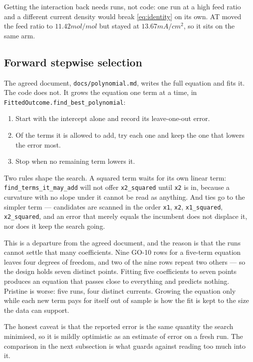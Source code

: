 Getting the interaction back needs runs, not code: one run at a high feed ratio and a different
current density would break \eqref{eq:identity} on its own. AT moved the feed ratio to
$11.42\unit{mol/mol}$ but stayed at $13.67\unit{mA/cm^2}$, so it sits on the same arm.

\subsection{Forward stepwise selection}

The agreed document, \texttt{docs/polynomial.md}, writes the full equation and fits it. The code
does not. It grows the equation one term at a time, in
\texttt{FittedOutcome.find\_best\_polynomial}:

\begin{enumerate}[nosep]
  \item Start with the intercept alone and record its leave-one-out error.
  \item Of the terms it is allowed to add, try each one and keep the one that lowers the error
        most.
  \item Stop when no remaining term lowers it.
\end{enumerate}

Two rules shape the search. A squared term waits for its own linear term:
\texttt{find\_terms\_it\_may\_add} will not offer \texttt{x2\_squared} until \texttt{x2} is in,
because a curvature with no slope under it cannot be read as anything. And ties go to the
simpler term --- candidates are scanned in the order \texttt{x1}, \texttt{x2},
\texttt{x1\_squared}, \texttt{x2\_squared}, and an error that merely equals the incumbent does
not displace it, nor does it keep the search going.

This is a departure from the agreed document, and the reason is that the runs cannot settle that
many coefficients. Nine GO-10 rows for a five-term equation leaves four degrees of freedom, and
two of the nine rows repeat two others --- so the design holds seven distinct points. Fitting
five coefficients to seven points produces an equation that passes close to everything and
predicts nothing. Pristine is worse: five runs, four distinct currents. Growing
the equation only while each new term pays for itself out of sample is how the fit is kept to the
size the data can support.

The honest caveat is that the reported error is the same quantity the search minimised, so it is
mildly optimistic as an estimate of error on a fresh run. The comparison in the next subsection
is what guards against reading too much into it.


